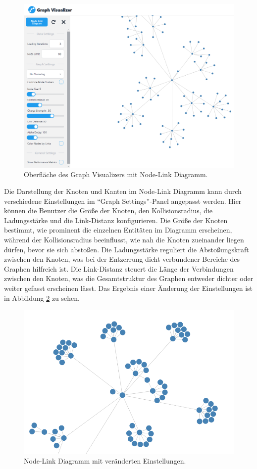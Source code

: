\begin{figure}[h]
    \centering
    \includegraphics[height=.5\textwidth]{images/03/GraphViewWithSettings.png}
    \caption{Oberfläche des Graph Visualizers mit Node-Link Diagramm.}
    \label{fig:realization:implementation:GraphViewWithSettings}
\end{figure}

Die Darstellung der Knoten und Kanten im Node-Link Diagramm kann durch verschiedene Einstellungen im \enquote{Graph Settings}-Panel angepasst werden. Hier können die Benutzer die Größe der Knoten, den Kollisionsradius, die Ladungsstärke und die Link-Distanz konfigurieren. Die Größe der Knoten bestimmt, wie prominent die einzelnen Entitäten im Diagramm erscheinen, während der Kollisionsradius beeinflusst, wie nah die Knoten zueinander liegen dürfen, bevor sie sich abstoßen. Die Ladungsstärke reguliert die Abstoßungskraft zwischen den Knoten, was bei der Entzerrung dicht verbundener Bereiche des Graphen hilfreich ist. Die Link-Distanz steuert die Länge der Verbindungen zwischen den Knoten, was die Gesamtstruktur des Graphen entweder dichter oder weiter gefasst erscheinen lässt. Das Ergebnis einer Änderung der Einstellungen ist in Abbildung \ref{fig:realization:implementation:NodeLinkWithChangedSettings} zu sehen.

\begin{figure}[h]
    \centering
    \includegraphics[height=.5\textwidth]{images/03/NodeLinkChangedSettings.png}
    \caption{Node-Link Diagramm mit veränderten Einstellungen.}
    \label{fig:realization:implementation:NodeLinkWithChangedSettings}
\end{figure}

